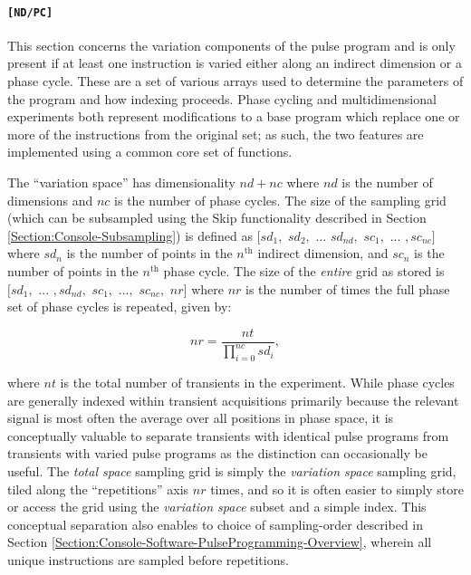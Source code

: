 \documentclass[PaulGanssle-Thesis.tex]{subfiles}
\begin{document}
\paragraph{\texttt{[ND/PC]}}
\label{Section:NDPCHeader}
This section concerns the variation components of the pulse program and is only present if at least one instruction is varied either along an indirect dimension or a phase cycle. These are a set of various arrays used to determine the parameters of the program and how indexing proceeds. Phase cycling and multidimensional experiments both represent modifications to a base program which replace one or more of the instructions from the original set; as such, the two features are implemented using a common core set of functions. 

The ``variation space'' has dimensionality $nd+nc$ where $nd$ is the number of dimensions and $nc$ is the number of phase cycles. The size of the sampling grid (which can be subsampled using the Skip functionality described in Section \ref{Section:Console-Subsampling}) is defined as $[sd_1,$ $sd_2,$ $...$ $sd_{nd},$ $sc_{1},$ $...$ $, sc_{nc}]$ where $sd_{n}$ is the number of points in the $n^{\mathrm{th}}$ indirect dimension, and $sc_{n}$ is the number of points in the $n^{\mathrm{th}}$ phase cycle. The size of the \textit{entire} grid as stored is $[sd_{1},$ $...$ $, sd_{nd},$ $sc_{1},$ $...,$ $sc_{nc},$ $nr]$ where $nr$ is the number of times the full phase set of phase cycles is repeated, given by:

\begin{equation*}
nr= \frac{nt}{\prod_{i=0}^{nc}sd_{i}},
\end{equation*}

where $nt$ is the total number of transients in the experiment. While phase cycles are generally indexed within transient acquisitions primarily because the relevant signal is most often the average over all positions in phase space, it is conceptually valuable to separate transients with identical pulse programs from transients with varied pulse programs as the distinction can occasionally be useful. The \textit{total space} sampling grid is simply the \textit{variation space} sampling grid, tiled along the ``repetitions'' axis $nr$ times, and so it is often easier to simply store or access the grid using the \textit{variation space} subset and a simple index. This conceptual separation also enables to choice of sampling-order described in Section \ref{Section:Console-Software-PulseProgramming-Overview}, wherein all unique instructions are sampled before repetitions.
\end{document}

